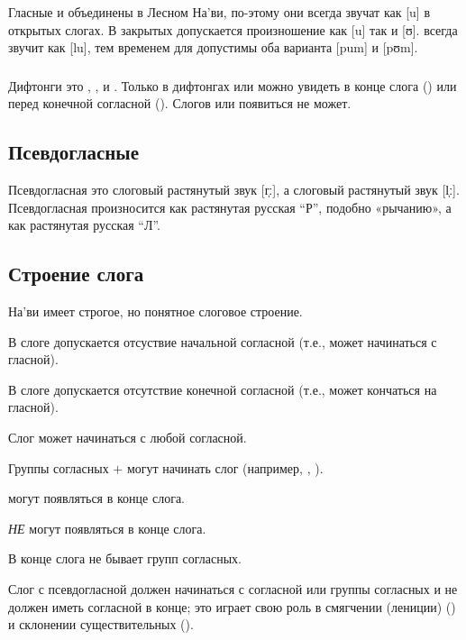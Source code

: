 \subsubsection{} Гласные  и  объединены в Лесном На'ви, 
по-этому они всегда звучат как [u] в открытых слогах. В закрытых допускается произношение как [u]
так и [ʊ].   всегда звучит как [lu],
тем временем для  допустимы оба варианта [pum] и [pʊm].


\subsubsection{} Дифтонги это , ,  и .
Только в дифтонгах  или  можно увидеть в конце слога () или перед конечной согласной ().  Слогов  или  появиться не может.

\subsection{Псевдогласные} Псевдогласная  это слоговый растянутый звук [r̩ː], а  слоговый растянутый звук [l̩ː]. Псевдогласная  произносится как растянутая русская ``Р'', подобно «рычанию», а  как растянутая русская ``Л''.

\subsection{Строение слога}
 На'ви имеет строгое, но понятное слоговое строение.

\begin{itemize*}
  \item В слоге допускается отсуствие начальной согласной (т.е., может начинаться с гласной).
  \item В слоге допускается отсутствие конечной согласной (т.е., может кончаться на гласной).
  \item Слог может начинаться с любой согласной.
  \item Группы согласных  $+$  могут начинать слог (например, , ).
  \item {} могут появляться в конце слога.
  \item {}  \textit{НЕ} могут появляться в конце слога.
  \item В конце слога не бывает групп согласных.
  \item \label{l-and-s:pseudo-no-null} Слог с псевдогласной должен начинаться с согласной или группы согласных и не должен иметь согласной в конце; это играет свою роль в смягчении (лениции)
    () и склонении существительных
    ().
\end{itemize*}

